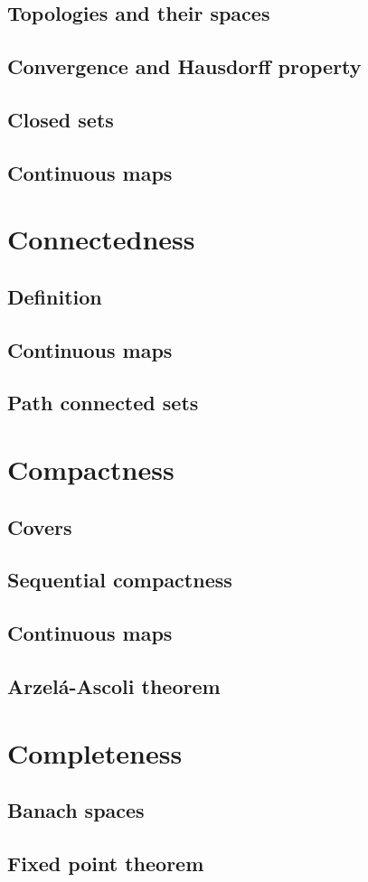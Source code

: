 \documentclass[../Year2.tex]{subfiles}
\begin{document}
\subsection{Topologies and their spaces}

\subsection{Convergence and Hausdorff property}

\subsection{Closed sets}

\subsection{Continuous maps}

\section{Connectedness}

\subsection{Definition}

\subsection{Continuous maps}

\subsection{Path connected sets}

\section{Compactness}

\subsection{Covers}

\subsection{Sequential compactness}

\subsection{Continuous maps}

\subsection{Arzelá-Ascoli theorem}

\section{Completeness}

\subsection{Banach spaces}

\subsection{Fixed point theorem}
\end{document}
